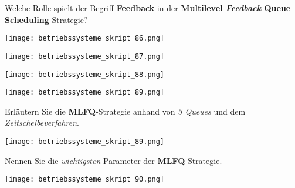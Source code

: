 \documentclass{article}
\begin{document}
\begin{tcolorbox}[colback=white!10!white,colframe=lightgray!75!black,
  savelowerto=\jobname_ex.tex,breakable,enhanced,lines before break=40]

\justifying
Welche Rolle spielt der Begriff \textbf{Feedback} in der \textbf{Multilevel \textit{Feedback} Queue Scheduling} Strategie?

\tcblower

\justifying
\begin{center}
\texttt{[image: betriebssysteme\_skript\_86.png]}
\end{center}
\begin{center}
\texttt{[image: betriebssysteme\_skript\_87.png]}
\end{center}
\begin{center}
\texttt{[image: betriebssysteme\_skript\_88.png]}
\end{center}
\begin{center}
\texttt{[image: betriebssysteme\_skript\_89.png]}
\end{center}

\end{tcolorbox}
\begin{tcolorbox}[colback=white!10!white,colframe=lightgray!75!black,
  savelowerto=\jobname_ex.tex,breakable,enhanced,lines before break=40]

\justifying
Erläutern Sie die \textbf{MLFQ}-Strategie anhand von \textit{3 Queues} und dem \textit{Zeitscheibeverfahren}.

\tcblower

\justifying
\begin{center}
\texttt{[image: betriebssysteme\_skript\_89.png]}
\end{center}

\end{tcolorbox}
\begin{tcolorbox}[colback=white!10!white,colframe=lightgray!75!black,
  savelowerto=\jobname_ex.tex,breakable,enhanced,lines before break=40]

\justifying
Nennen Sie die \textit{wichtigsten} Parameter der \textbf{MLFQ}-Strategie.

\tcblower

\justifying
\begin{center}
\texttt{[image: betriebssysteme\_skript\_90.png]}
\end{center}

\end{tcolorbox}
\end{document}
